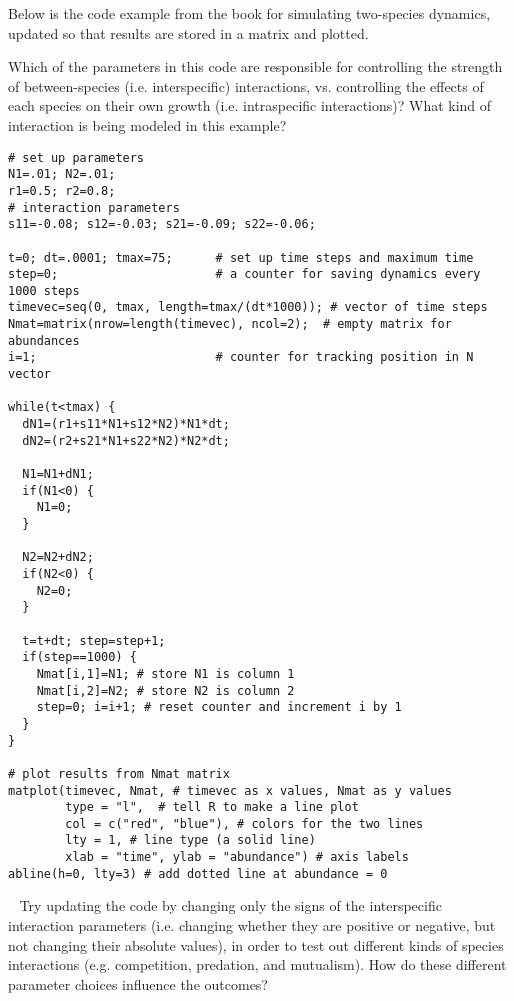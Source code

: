 \documentclass[12pt]{article}
\begin{document}
\date{}
\maketitle


\newline
Below is the code example from the book for simulating two-species dynamics, updated so that results are stored in a matrix and plotted.

Which of the parameters in this code are responsible for controlling the strength of between-species (i.e. interspecific) interactions, vs. controlling the effects of each species on their own growth (i.e. intraspecific interactions)? What kind of interaction is being modeled in this example?

\begin{verbatim}
# set up parameters
N1=.01; N2=.01;
r1=0.5; r2=0.8;
# interaction parameters
s11=-0.08; s12=-0.03; s21=-0.09; s22=-0.06;

t=0; dt=.0001; tmax=75;      # set up time steps and maximum time
step=0;                      # a counter for saving dynamics every 1000 steps
timevec=seq(0, tmax, length=tmax/(dt*1000)); # vector of time steps
Nmat=matrix(nrow=length(timevec), ncol=2);  # empty matrix for abundances
i=1;                         # counter for tracking position in N vector

while(t<tmax) {
  dN1=(r1+s11*N1+s12*N2)*N1*dt;
  dN2=(r2+s21*N1+s22*N2)*N2*dt;
  
  N1=N1+dN1;
  if(N1<0) {
    N1=0;
  }
  
  N2=N2+dN2;
  if(N2<0) {
    N2=0;
  }
  
  t=t+dt; step=step+1;
  if(step==1000) {
    Nmat[i,1]=N1; # store N1 is column 1
    Nmat[i,2]=N2; # store N2 is column 2
    step=0; i=i+1; # reset counter and increment i by 1
  }
}

# plot results from Nmat matrix
matplot(timevec, Nmat, # timevec as x values, Nmat as y values
        type = "l",  # tell R to make a line plot
        col = c("red", "blue"), # colors for the two lines
        lty = 1, # line type (a solid line)
        xlab = "time", ylab = "abundance") # axis labels
abline(h=0, lty=3) # add dotted line at abundance = 0
\end{verbatim}


~\newline
{}
\newline
Try updating the code by changing only the signs of the interspecific interaction parameters (i.e. changing whether they are positive or negative, but not changing their absolute values), in order to test out different kinds of species interactions (e.g. competition, predation, and mutualism). How do these different parameter choices influence the outcomes?
\end{document}
